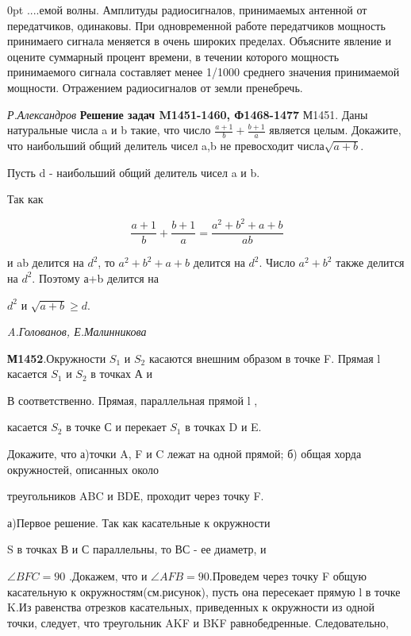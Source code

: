 \newpage

\pagestyle {fancy}
\begin{multicols}{2}

\setlength { \parindent } {0pt} 
....емой волны. Амплитуды радиосигналов, принимаемых антенной от передатчиков, одинаковы. При одновременной работе передатчиков мощность принимаего сигнала меняется в очень широких пределах. Объясните явление и оцените суммарный процент времени, в течении которого мощность принимаемого сигнала составляет менее 1/1000 среднего значения принимаемой мощности. Отражением радиосигналов от земли пренебречь.

\textit{Р.Александров}
\vspace { 3mm }
\textbf{Решение задач M1451-1460, Ф1468-1477}
М1451. Даны натуральные числа a и b такие, что число  $\frac {a+1} { b } + \frac{b+1}{a}$ является целым. Докажите, что наибольший общий делитель чисел a,b не превосходит числа$\sqrt{a+b}$.

Пусть d - наибольший общий делитель чисел a и b.

Так как

$$\frac {a+1} { b } + \frac{b+1}{a} = \frac{a ^ 2 + b ^2 +a +b}{ab}$$

и ab делится на $d^2$, то  $a^2+b^2+a+b$ делится на $d^2$. Число $a^2+b^2$ также делится на $d^2$. Поэтому а+b делится на

$d^2$ и $ \sqrt{a+b} \geq d$.

\textit{A.Голованов, Е.Малинникова}

\vspace { 3mm }

\textbf{М1452}.Окружности $S_ 1$ и $S_ 2$ касаются внешним образом в точке F. Прямая l касается $S_ 1$ и $S_ 2$ в точках А и

В соответственно. Прямая, параллельная прямой l ,

касается $S_ 2$ в точке С и перекает $S_ 1$ в точках D и E.

Докажите, что а)точки A, F и C лежат на одной прямой; б) общая хорда окружностей, описанных около

треугольников ABC и BDЕ, проходит через точку F.

\vspace { 3mm }

а)Первое решение. Так как касательные к окружности

S в точках В и С параллельны, то ВС - ее диаметр, и

$\angle{BFC} = 90$ .Докажем, что и $\angle{AFB} = 90$.Проведем через точку F общую касательную к окружностям(см.рисунок), пусть она пересекает прямую l в точке K.Из равенства отрезков касательных, приведенных к окружности из одной точки, следует, что треугольник AKF и BKF равнобедренные. Следовательно,


\end{multicols}
